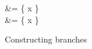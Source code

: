 \begin{figure}[H]
\flushleft{}
\begin{salign}
    &= \{ x \mapsto \kappa \}
   \\
    &= \{ x \mapsto \kappa \}
   \\
\end{salign}
\caption{Constructing branches}
\end{figure}
